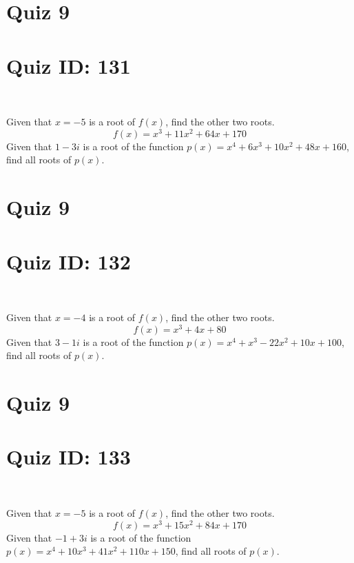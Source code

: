 \documentclass{exam}
\begin{document}
\section*{Quiz 9}
\section*{Quiz ID: 131}
\vspace{0.5cm}\
\vspace{1cm}\
\begin{questions}
\question Given that $x=-5$ is a root of $f(x)$, find the other two roots.\[f(x)=
x^3 + 11x^2 + 64x + 170\]
\newpage
\question Given that $1-3\mathit{i}$ is a root of the function $p(x)=
x^4 + 6x^3 + 10x^2 + 48x + 160$, find all roots of $p(x)$. 
\end{questions}\newpage
\newpage
\section*{Quiz 9}
\section*{Quiz ID: 132}
\vspace{0.5cm}\
\vspace{1cm}\
\begin{questions}
\question Given that $x=-4$ is a root of $f(x)$, find the other two roots.\[f(x)=
x^3 + 4x + 80\]
\newpage
\question Given that $3-1\mathit{i}$ is a root of the function $p(x)=
x^4 + x^3 - 22x^2 + 10x + 100$, find all roots of $p(x)$. \makeemptybox{\stretch{1}}
\end{questions}\newpage
\newpage
\section*{Quiz 9}
\section*{Quiz ID: 133}
\vspace{0.5cm}\
\vspace{1cm}\
\begin{questions}
\question Given that $x=-5$ is a root of $f(x)$, find the other two roots.\[f(x)=
x^3 + 15x^2 + 84x + 170\]
\newpage
\question Given that $-1+3\mathit{i}$ is a root of the function $p(x)=
x^4 + 10x^3 + 41x^2 + 110x + 150$, find all roots of $p(x)$. \makeemptybox{\stretch{1}}
\end{questions}\newpage
\newpage
\end{document}
